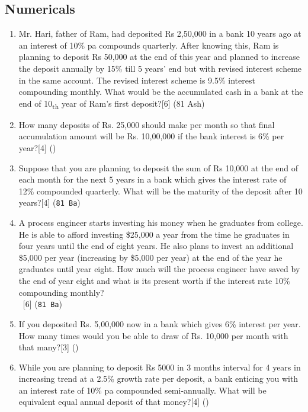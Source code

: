 \documentclass[12pt]{article}
\newcommand{\enter}{\\\textcolor{white}{1}}
\begin{document}
	\subsection{Numericals}
	\begin{enumerate}
	\item Mr. Hari, father of Ram, had deposited Rs 2,50,000 in a bank 10 years ago at an interest of 10\% pa compounds quarterly. After knowing this, Ram is planning to deposit Rs 50,000 at the end of this year and planned to increase the deposit annually by 15\% till 5 years' end but with revised interest scheme in the same account. The revised interest scheme is 9.5\% interest compounding monthly. What would be the accumulated cash in a bank at the end of 10\textsubscript{th} year of Ram's first deposit?\hfill[6] (81 Ash)

	\item How many deposits of Rs. 25,000 should make per month so that final accumulation amount will be Rs. 10,00,000 if the bank interest is 6\% per year?\hfill[4] ()

	\item Suppose that you are planning to deposit the sum of Rs 10,000 at the end of each month for the next 5 years in a bank which gives the interest rate of 12\% compounded quarterly. What will be the maturity of the deposit after 10 years?\hfill[4] (\texttt{81 Ba})

	\item A process engineer starts investing his money when he graduates from college. He is able to afford investing \$25,000 a year from the time he graduates in four years until the end of eight years. He also plans to invest an additional \$5,000 per year (increasing by \$5,000 per year) at the end of the year he graduates until year eight. How much will the process engineer have saved by the end of year eight and what is its present worth if the interest rate 10\% compounding monthly?
	\enter\hfill [6] (\texttt{81 Ba})

	\item If you deposited Rs. 5,00,000 now in a bank which gives 6\% interest per year. How many times would you be able to draw of Rs. 10,000 per month with that many?\hfill[3] ()

	\item While you are planning to deposit Rs 5000 in 3 months interval for 4 years in increasing trend at a 2.5\% growth rate per deposit, a bank enticing you with an interest rate of 10\% pa compounded semi-annually. What will be equivalent equal annual deposit of that money?\hfill[4] ()


\end{enumerate}
\end{document}
